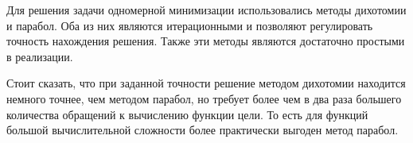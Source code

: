 \documentclass[../body.tex]{subfiles}
\begin{document}
Для решения задачи одномерной минимизации использовались методы дихотомии и парабол. Оба из них являются итерационными и позволяют регулировать точность нахождения решения. Также эти методы являются достаточно простыми в реализации.

Стоит сказать, что при заданной точности решение методом дихотомии находится немного точнее, чем методом парабол, но требует более чем в два раза большего количества обращений к вычислению функции цели. То есть для функций большой вычислительной сложности более практически выгоден метод парабол.
\end{document}
